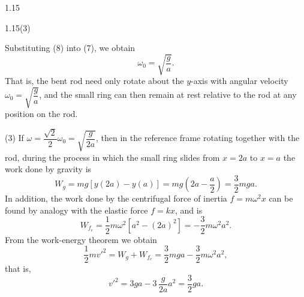\begin{solution}{1.15}
\begin{figbox}{1.15(3)}
\end{figbox}

Substituting (8) into (7), we obtain
\[
\omega_0=\sqrt{\frac{g}{a}}.
\]
That is, the bent rod need only rotate about the $y$-axis with angular velocity $\omega_0=\sqrt{\dfrac{g}{a}}$, and the small ring can then remain at rest relative to the rod at any position on the rod.

(3) If $\omega=\dfrac{\sqrt{2}}{2}\omega_0=\sqrt{\dfrac{g}{2a}}$, then in the reference frame rotating together with the rod, during the process in which the small ring slides from $x=2a$ to $x=a$ the work done by gravity is
\[
W_g=mg\left[y(2a)-y(a)\right]=mg\left(2a-\frac{a}{2}\right)=\frac{3}{2}mga.
\]
In addition, the work done by the centrifugal force of inertia $f=m\omega^2x$ can be found by analogy with the elastic force $f=kx$, and is
\[
W_{f_c}=\frac{1}{2}m\omega^2\left[a^2-(2a)^2\right]=-\frac{3}{2}m\omega^2a^2.
\]
From the work-energy theorem we obtain
\[
\frac{1}{2}mv'^2=W_g+W_{f_c}=\frac{3}{2}mga-\frac{3}{2}m\omega^2a^2,
\]
that is,
\begin{equation}
v'^2=3ga-3\,\frac{g}{2a}a^2=\frac{3}{2}ga. \tag{9}
\end{equation}


\end{solution}
